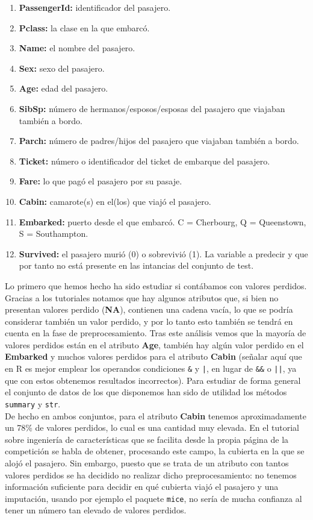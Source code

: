 \documentclass[10pt,a4paper]{article}
\newcommand{\code}[1]{\textcolor{rblue}{\texttt{#1}}} %
\begin{document}
\begin{enumerate}
\item \textbf{PassengerId: } identificador del pasajero.
\item \textbf{Pclass: } la clase en la que embarcó.
\item \textbf{Name:} el nombre del pasajero.
\item \textbf{Sex: } sexo del pasajero.
\item \textbf{Age: } edad del pasajero.
\item \textbf{SibSp: } número de hermanos/esposos/esposas del pasajero que viajaban también a bordo.
\item \textbf{Parch: } número de padres/hijos del pasajero que viajaban también a bordo.
\item \textbf{Ticket: } número o identificador del ticket de embarque del pasajero.
\item \textbf{Fare: } lo que pagó el pasajero por su pasaje.
\item \textbf{Cabin: } camarote(s) en el(los) que viajó el pasajero.
\item \textbf{Embarked: } puerto desde el que embarcó. C = Cherbourg, Q = Queenstown, S = Southampton.
\item \textbf{Survived: } el pasajero murió (0) o sobrevivió (1). La variable a predecir y que por tanto no está presente en las intancias del conjunto de test.
\end{enumerate}

Lo primero que hemos hecho ha sido estudiar si contábamos con valores perdidos. Gracias a los tutoriales notamos que hay algunos atributos que, si bien no presentan valores perdido (\textbf{NA}), contienen una cadena vacía, lo que se podría considerar también un valor perdido, y por lo tanto esto también se tendrá en cuenta en la fase de preprocesamiento. Tras este análisis vemos que la mayoría de valores perdidos están en el atributo \textbf{Age}, también hay algún valor perdido en el \textbf{Embarked} y muchos valores perdidos para el atributo \textbf{Cabin} (señalar aquí que en R es mejor emplear los operandos condiciones \code{\&} y \code{|}, en lugar de \texttt{\&\&} o \texttt{||}, ya que con estos obtenemos resultados incorrectos). Para estudiar de forma general el conjunto de datos de los que disponemos han sido de utilidad los métodos \code{summary} y \code{str}.\\

De hecho en ambos conjuntos, para el atributo \textbf{Cabin} tenemos aproximadamente un 78\% de valores perdidos, lo cual es una cantidad muy elevada. En el tutorial sobre ingeniería de características que se facilita desde la propia página de la competición se habla de obtener, procesando este campo, la cubierta en la que se alojó el pasajero. Sin embargo, puesto que se trata de un atributo con tantos valores perdidos se ha decidido no realizar dicho preprocesamiento: no tenemos información suficiente para decidir en qué cubierta viajó el pasajero y una imputación, usando por ejemplo el paquete \code{mice}, no sería de mucha confianza al tener un número tan elevado de valores perdidos.\\
\end{document}
